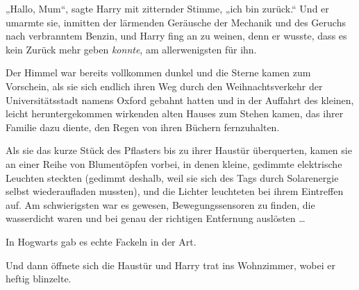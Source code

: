 „Hallo, Mum“, sagte Harry mit zitternder Stimme, „ich bin zurück.“ Und er umarmte sie, inmitten der lärmenden Geräusche der Mechanik und des Geruchs nach verbranntem Benzin, und Harry fing an zu weinen, denn er wusste, dass es kein Zurück mehr geben \emph{konnte}, am allerwenigsten für ihn.

\later

Der Himmel war bereits vollkommen dunkel und die Sterne kamen zum Vorschein, als sie sich endlich ihren Weg durch den Weihnachtsverkehr der Universitätsstadt namens Oxford gebahnt hatten und in der Auffahrt des kleinen, leicht heruntergekommen wirkenden alten Hauses zum Stehen kamen, das ihrer Familie dazu diente, den Regen von ihren Büchern fernzuhalten.

Als sie das kurze Stück des Pflasters bis zu ihrer Haustür überquerten, kamen sie an einer Reihe von Blumentöpfen vorbei, in denen kleine, gedimmte elektrische Leuchten steckten (gedimmt deshalb, weil sie sich des Tags durch Solarenergie selbst wiederaufladen mussten), und die Lichter leuchteten bei ihrem Eintreffen auf. Am schwierigsten war es gewesen, Bewegungssensoren zu finden, die wasserdicht waren und bei genau der richtigen Entfernung auslösten …

In Hogwarts gab es echte Fackeln in der Art.

Und dann öffnete sich die Haustür und Harry trat ins Wohnzimmer, wobei er heftig blinzelte.

